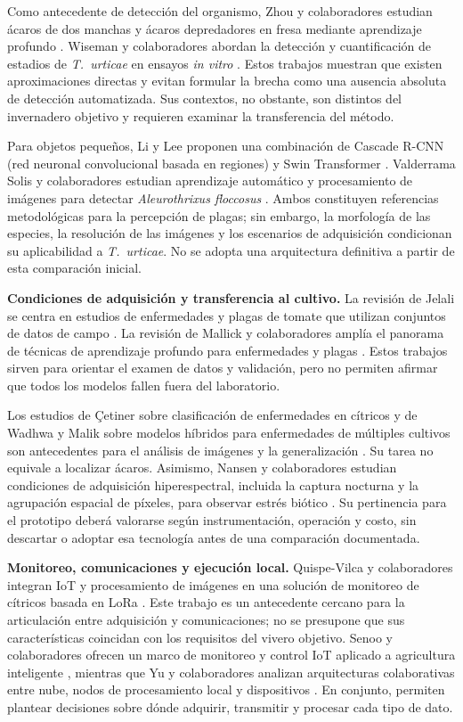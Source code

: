 Como antecedente de detección del organismo, Zhou y colaboradores estudian
ácaros de dos manchas y ácaros depredadores en fresa mediante aprendizaje
profundo \cite{zhou2023}. Wiseman y colaboradores abordan la detección y
cuantificación de estadios de \textit{T.~urticae} en ensayos \textit{in vitro}
\cite{wiseman2025invitro}. Estos trabajos muestran que existen aproximaciones
directas y evitan formular la brecha como una ausencia absoluta de detección
automatizada. Sus contextos, no obstante, son distintos del invernadero
objetivo y requieren examinar la transferencia del método.

Para objetos pequeños, Li y Lee proponen una combinación de Cascade R-CNN
(red neuronal convolucional basada en regiones) y Swin Transformer
\cite{li2022cascade}. Valderrama Solis y colaboradores estudian aprendizaje
automático y procesamiento de imágenes para detectar
\textit{Aleurothrixus floccosus} \cite{valderrama2025aleurothrixus}.
Ambos constituyen referencias metodológicas para la percepción de plagas;
sin embargo, la morfología de las especies, la resolución de las imágenes y
los escenarios de adquisición condicionan su aplicabilidad a
\textit{T.~urticae}. No se adopta una arquitectura definitiva a partir de esta
comparación inicial.

\textbf{Condiciones de adquisición y transferencia al cultivo.}
La revisión de Jelali se centra en estudios de enfermedades y plagas de tomate
que utilizan conjuntos de datos de campo \cite{jelali2024}. La revisión de
Mallick y colaboradores amplía el panorama de técnicas de aprendizaje profundo
para enfermedades y plagas \cite{mallick2025review}. Estos trabajos sirven
para orientar el examen de datos y validación, pero no permiten afirmar que
todos los modelos fallen fuera del laboratorio.

Los estudios de Çetiner sobre clasificación de enfermedades en cítricos y de
Wadhwa y Malik sobre modelos híbridos para enfermedades de múltiples cultivos
son antecedentes para el análisis de imágenes y la generalización
\cite{cetiner2022citrus,wadhwa2026hybrid}. Su tarea no equivale a localizar
ácaros. Asimismo, Nansen y colaboradores estudian condiciones de adquisición
hiperespectral, incluida la captura nocturna y la agrupación espacial de
píxeles, para observar estrés biótico \cite{nansen2024methods}. Su pertinencia
para el prototipo deberá valorarse según instrumentación, operación y costo,
sin descartar o adoptar esa tecnología antes de una comparación documentada.

\textbf{Monitoreo, comunicaciones y ejecución local.}
Quispe-Vilca y colaboradores integran IoT y procesamiento de imágenes en una
solución de monitoreo de cítricos basada en LoRa \cite{quispe2024lora}. Este
trabajo es un antecedente cercano para la articulación entre adquisición y
comunicaciones; no se presupone que sus características coincidan con los
requisitos del vivero objetivo. Senoo y colaboradores ofrecen un marco de
monitoreo y control IoT aplicado a agricultura inteligente
\cite{senoo2023iot}, mientras que Yu y colaboradores analizan arquitecturas
colaborativas entre nube, nodos de procesamiento local y dispositivos
\cite{yu2025}. En conjunto, permiten plantear decisiones sobre dónde adquirir,
transmitir y procesar cada tipo de dato.

